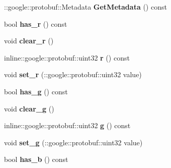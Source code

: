 \begin{DoxyCompactItemize}
\item 
\hypertarget{classvss__state_1_1RGB_a72a71c6babca0d3cbd79caf9d8c9c9b2}{\-::google\-::protobuf\-::\-Metadata {\bfseries Get\-Metadata} () const }\label{classvss__state_1_1RGB_a72a71c6babca0d3cbd79caf9d8c9c9b2}

\item 
\hypertarget{classvss__state_1_1RGB_a44a2e2f01894715c2732c8455a27c158}{bool {\bfseries has\-\_\-r} () const }\label{classvss__state_1_1RGB_a44a2e2f01894715c2732c8455a27c158}

\item 
\hypertarget{classvss__state_1_1RGB_acf08083664a7f2da6c10b8faf4b25383}{void {\bfseries clear\-\_\-r} ()}\label{classvss__state_1_1RGB_acf08083664a7f2da6c10b8faf4b25383}

\item 
\hypertarget{classvss__state_1_1RGB_ab1fb0a4d6eebeb673bc32c90b1b906ed}{inline\-::google\-::protobuf\-::uint32 {\bfseries r} () const }\label{classvss__state_1_1RGB_ab1fb0a4d6eebeb673bc32c90b1b906ed}

\item 
\hypertarget{classvss__state_1_1RGB_a33dd755c711c8a7f5a1897e42ea4c711}{void {\bfseries set\-\_\-r} (\-::google\-::protobuf\-::uint32 value)}\label{classvss__state_1_1RGB_a33dd755c711c8a7f5a1897e42ea4c711}

\item 
\hypertarget{classvss__state_1_1RGB_a15f5bdc6f737b63ee48b030fb4348c3a}{bool {\bfseries has\-\_\-g} () const }\label{classvss__state_1_1RGB_a15f5bdc6f737b63ee48b030fb4348c3a}

\item 
\hypertarget{classvss__state_1_1RGB_acb92f198e1d2336c7f76a3aef3fb4cb2}{void {\bfseries clear\-\_\-g} ()}\label{classvss__state_1_1RGB_acb92f198e1d2336c7f76a3aef3fb4cb2}

\item 
\hypertarget{classvss__state_1_1RGB_a36c2e8312984ac3b4577c6aae15878b2}{inline\-::google\-::protobuf\-::uint32 {\bfseries g} () const }\label{classvss__state_1_1RGB_a36c2e8312984ac3b4577c6aae15878b2}

\item 
\hypertarget{classvss__state_1_1RGB_a353c8a4e1ff0d19c5a093b910797c7b9}{void {\bfseries set\-\_\-g} (\-::google\-::protobuf\-::uint32 value)}\label{classvss__state_1_1RGB_a353c8a4e1ff0d19c5a093b910797c7b9}

\item 
\hypertarget{classvss__state_1_1RGB_ad56ba40a1f62f12c828f60042dde4121}{bool {\bfseries has\-\_\-b} () const }\label{classvss__state_1_1RGB_ad56ba40a1f62f12c828f60042dde4121}


\end{DoxyCompactItemize}
